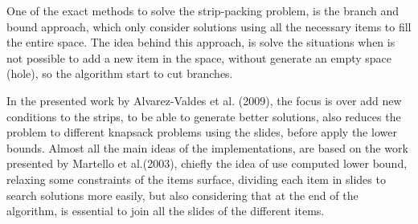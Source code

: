 One of the exact methods to solve the strip-packing problem,
is the branch and bound approach,
which only consider solutions using all the necessary items
to fill the entire space.
The idea behind this approach, is solve the situations when
is not possible to add a new item in the space,
without generate an empty space (hole),
so the algorithm start to cut branches.

In the presented work by Alvarez-Valdes et al. (2009)\cite{alvarez},
the focus is over add new conditions to the strips,
to be able to generate better solutions,
also reduces the problem to different knapsack problems using the slides,
before apply the lower bounds.
Almost all the main ideas of the implementations,
are based on the work presented by Martello et al.(2003)\cite{martello},
chiefly the idea of use computed lower bound,
relaxing some constraints of the items surface,
dividing each item in slides to search solutions
more easily, but also considering that at the end of the algorithm,
is essential to join all the slides of the different items.








% 
